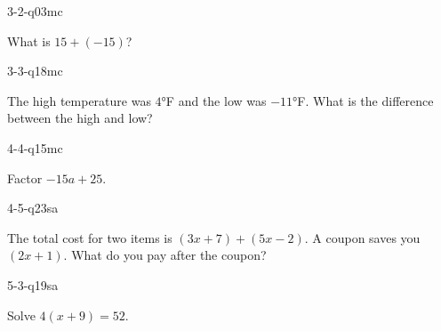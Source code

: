 \begin{practiceQuestion}{3-2-q03}{mc}
\begin{questionText}
What is $15 + (-15)$?
\end{questionText}
\end{practiceQuestion}

\begin{practiceQuestion}{3-3-q18}{mc}
\begin{questionText}
The high temperature was $4°$F and the low was $-11°$F. What is the difference between the high and low?
\end{questionText}
\end{practiceQuestion}

\begin{practiceQuestion}{4-4-q15}{mc}
\begin{questionText}
Factor $-15a + 25$.
\end{questionText}
\end{practiceQuestion}

\begin{practiceQuestion}{4-5-q23}{sa}
\begin{questionText}
The total cost for two items is $(3x + 7) + (5x - 2)$. A coupon saves you $(2x + 1)$. What do you pay after the coupon?
\end{questionText}
\end{practiceQuestion}

\begin{practiceQuestion}{5-3-q19}{sa}
\begin{questionText}
Solve $4(x + 9) = 52$.
\end{questionText}
\end{practiceQuestion}

